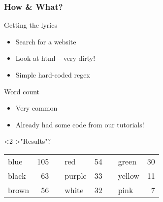 \documentclass[presentation]{beamer}
\begin{document}
\begin{frame}
\frametitle{How \& What?}
\label{sec-2_2}
\begin{block}{Getting the lyrics}
\label{sec-2_2_1}
\begin{itemize}

\item Search for a website\\
\label{sec-2_2_1_1}%
\item Look at html -- very dirty!\\
\label{sec-2_2_1_2}%
\item Simple hard-coded regex\\
\label{sec-2_2_1_3}%
\end{itemize} %
\end{block}
\begin{block}{Word count}
\label{sec-2_2_2}
\begin{itemize}

\item Very common\\
\label{sec-2_2_2_1}%
\item Already had some code from our tutorials!\\
\label{sec-2_2_2_2}%
\end{itemize} %
\end{block}
\begin{alertblock}<2->{"Results"?}
\label{sec-2_2_3}


\begin{center}
\begin{tabular}{lrllrllr}
 blue   &  105  &     &  red     &  54  &     &  green   &  30  \\
 black  &   63  &     &  purple  &  33  &     &  yellow  &  11  \\
 brown  &   56  &     &  white   &  32  &     &  pink    &   7  \\
\end{tabular}
\end{center}
\end{alertblock}
\end{frame}
\end{document}
